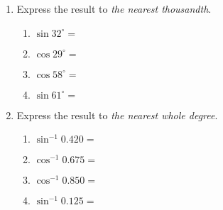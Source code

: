 \documentclass[12pt, twoside]{article}
\begin{document}
\begin{enumerate}
\item Express the result to \emph{the nearest thousandth}.  \vspace{0.5cm}
\begin{multicols}{2}
  \begin{enumerate}
    \item $\sin 32^\circ = $ \vspace{1cm}
    \item $\cos 29^\circ =$
    \item $\cos 58^\circ = $ \vspace{1cm}
    \item $\sin 61^\circ =$
  \end{enumerate}
\end{multicols} \vspace{0.5cm}

\item Express the result to \emph{the nearest whole degree}.  \vspace{0.5cm}
\begin{multicols}{2}
  \begin{enumerate}
    \item $\sin^{-1} 0.420 = $ \vspace{1cm}
    \item $\cos^{-1} 0.675 =$
    \item $\cos^{-1} 0.850 = $ \vspace{1cm}
    \item $\sin^{-1} 0.125 =$
  \end{enumerate}
\end{multicols}

\end{enumerate}
\end{document}
